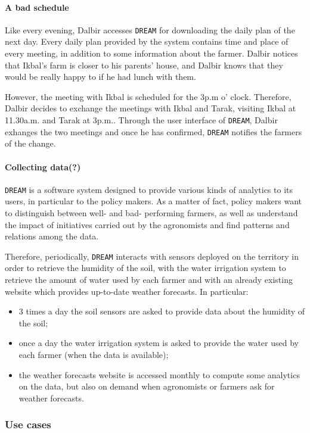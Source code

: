 \documentclass{article}
\begin{document}
\paragraph{A bad schedule}
Like every evening, Dalbir accesses \verb|DREAM| for downloading the daily plan of the next day. Every daily plan provided by the system contains time and place of every meeting, in addition to some information about the farmer. Dalbir notices that Ikbal's farm is closer to his parents' house, and Dalbir knows that they would be really happy to if he had lunch with them.\par
\noindent However, the meeting with Ikbal is scheduled for the 3p.m o' clock. Therefore, Dalbir decides to exchange the meetings with Ikbal and Tarak, visiting Ikbal at 11.30a.m. and Tarak at 3p.m.. Through the user interface of \verb|DREAM|, Dalbir exhanges the two meetings and once he has confirmed, \verb|DREAM| notifies the farmers of the change.
\paragraph{Collecting data(?)}
\verb|DREAM| is a software system designed to provide various kinds of analytics to its users, in particular to the policy makers. As a matter of fact, policy makers want to distinguish between well- and bad- performing farmers, as well as understand the impact of initiatives carried out by the agronomists and find patterns and relations among the data.\par
\noindent Therefore, periodically, \verb|DREAM| interacts with sensors deployed on the territory in order to retrieve the humidity of the soil, with the water irrigation system to retrieve the amount of water used by each farmer and with an already existing website which provides up-to-date weather forecasts. In particular:
\begin{itemize}
    \item 3 times a day the soil sensors are asked to provide data about the humidity of the soil;
    \item once a day the water irrigation system is asked to provide the water used by each farmer (when the data is available);
    \item the weather forecasts website is accessed monthly to compute some analytics on the data, but also on demand when agronomists or farmers ask for weather forecasts.
\end{itemize}

\subsubsection{Use cases}
\end{document}
